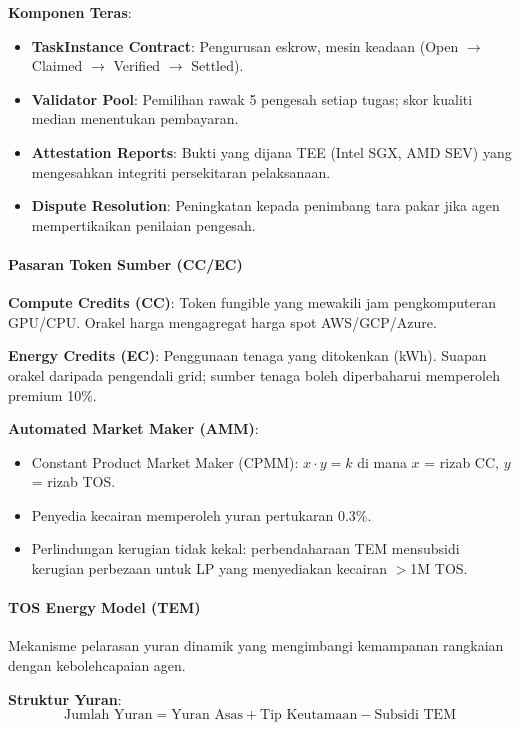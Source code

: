 \documentclass[11pt]{article}
\begin{document}
\textbf{Komponen Teras}:
\begin{itemize}[noitemsep]
  \item \textbf{TaskInstance Contract}: Pengurusan eskrow, mesin keadaan (Open $\to$ Claimed $\to$ Verified $\to$ Settled).
  \item \textbf{Validator Pool}: Pemilihan rawak 5 pengesah setiap tugas; skor kualiti median menentukan pembayaran.
  \item \textbf{Attestation Reports}: Bukti yang dijana TEE (Intel SGX, AMD SEV) yang mengesahkan integriti persekitaran pelaksanaan.
  \item \textbf{Dispute Resolution}: Peningkatan kepada penimbang tara pakar jika agen mempertikaikan penilaian pengesah.
\end{itemize}

\paragraph{Pasaran Token Sumber (CC/EC)}
\textbf{Compute Credits (CC)}: Token fungible yang mewakili jam pengkomputeran GPU/CPU. Orakel harga mengagregat harga spot AWS/GCP/Azure.

\textbf{Energy Credits (EC)}: Penggunaan tenaga yang ditokenkan (kWh). Suapan orakel daripada pengendali grid; sumber tenaga boleh diperbaharui memperoleh premium 10\%.

\textbf{Automated Market Maker (AMM)}:
\begin{itemize}[noitemsep]
  \item Constant Product Market Maker (CPMM): $x \cdot y = k$ di mana $x$ = rizab CC, $y$ = rizab TOS.
  \item Penyedia kecairan memperoleh yuran pertukaran 0.3\%.
  \item Perlindungan kerugian tidak kekal: perbendaharaan TEM mensubsidi kerugian perbezaan untuk LP yang menyediakan kecairan $>$1M TOS.
\end{itemize}

\paragraph{TOS Energy Model (TEM)}
Mekanisme pelarasan yuran dinamik yang mengimbangi kemampanan rangkaian dengan kebolehcapaian agen.

\textbf{Struktur Yuran}:
\begin{equation}
\text{Jumlah Yuran} = \text{Yuran Asas} + \text{Tip Keutamaan} - \text{Subsidi TEM}
\end{equation}
\end{document}
